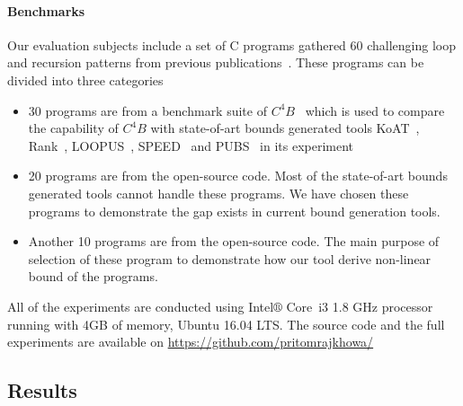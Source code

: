 \paragraph{Benchmarks}
 Our evaluation subjects include a set of C programs gathered 60 challenging loop and recursion patterns from previous publications~\cite{Gulwani:2010:RP:1806596.1806630,speed1,Carbonneaux:2015:CCR:2737924.2737955}. These programs can be divided into three categories
\begin{itemize}
	\item 30 programs are from a benchmark suite of $C^4B$~\cite{Carbonneaux:2015:CCR:2737924.2737955} which is used to compare the capability of $C^4B$ with state-of-art bounds generated tools KoAT~\cite{Brockschmidt:2016:ARS:2982214.2866575}, Rank~\cite{Alias:2010:MRP:1882094.1882102}, LOOPUS~\cite{10.1007/978-3-319-08867-9_50}, SPEED~\cite{speed1} and PUBS~\cite{Albert:2012:CAO:2076807.2077025} in its experiment
	
	\item 20 programs are from the open-source code. Most of the state-of-art bounds generated tools cannot handle these programs. We have chosen these programs to demonstrate the gap exists in current bound generation tools.
	
	\item Another 10 programs are from the open-source code. The main purpose of selection of these program to demonstrate how our tool derive non-linear bound of the programs.  
	
	
	
\end{itemize}

All of the experiments are conducted using Intel$\circledR$ Core\texttrademark\ i3 1.8 GHz processor running with 4GB of memory, Ubuntu 16.04 LTS. The source code and the full experiments are available on \url{https://github.com/pritomrajkhowa/}


\subsection{Results}



